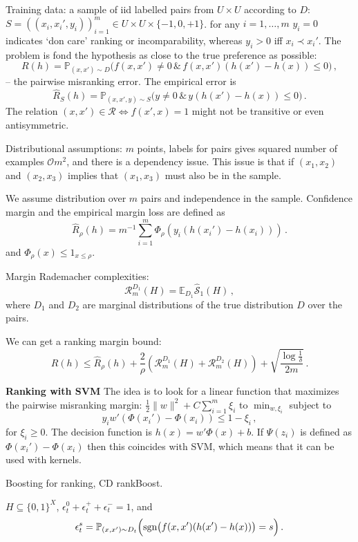 \documentclass[a4paper]{article}
\newcommand{\ex}{\mathbb{E}}
\newcommand{\pr}{\mathbb{P}}
\begin{document}
Training data: a sample of iid labelled pairs from $U\times U$ according to $D$:
$S = ((x_i, x_i', y_i))_{i=1}^m\in U\times U\times \{-1, 0, +1\}$. for any $i=1,\ldots, m$
$y_i = 0$ indicates `don care' ranking or incomparability, whereas $y_i>0$ iff
$x_i \prec x_i'$. The problem is fond the hypothesis as close to the true preference
as possible:
\[ R(h) = \pr_{(x,x')\sim D} \bigl( f(x,x') \neq 0\,\&\,f(x,x')(h(x')-h(x)) \leq 0 \bigr)
    \,,\]
-- the pairwise misranking error. The empirical error is
\[ \hat{R}_S(h) = \pr_{(x,x',y)\sim S} \bigl( y \neq 0\,\&\,y (h(x')-h(x)) \leq 0 \bigr)
    \,.\]
The relation $(x,x')\in \mathcal{R} \Leftrightarrow f(x',x) = 1$ might not be transitive
or even antisymmetric.

Distributional assumptions: $m$ points, labels for pairs gives squared number of
examples $\mathcal{O}m^2$, and there is a dependency issue. This issue is that if
$(x_1,x_2)$ and $(x_2,x_3)$ implies that $(x_1,x_3)$ must also be in the sample.

We assume distribution over $m$ pairs and independence in the sample. Confidence
margin and the empirical margin loss are defined as
\[ \hat{R}_\rho(h) = m^{-1} \sum_{i=1}^m \Phi_\rho(y_i (h(x_i') - h(x_i))) \,. \]
and $\Phi_\rho(x) \leq 1_{x\leq \rho}$.

Margin Rademacher complexities: 
\[\mathcal{R}_m^{D_1}(H) = \ex_{D_1} \hat{\mathcal{S}}_1(H) \,, \]
where $D_1$ and $D_2$ are marginal distributions of the true distribution $D$ over
the pairs.

We can get a ranking margin bound:
\[ R(h) \leq \hat{R}_\rho(h)
    + \frac{2}{\rho}(\mathcal{R}_m^{D_1}(H)+\mathcal{R}_m^{D_2}(H))
    + \sqrt{\frac{\log\frac{1}{\delta}}{2m}}
    \,. \]

\textbf{Ranking with SVM} The idea is to look for a linear function that maximizes
the pairwise misranking margin: $\frac{1}{2}\|w\|^2 + C \sum_{i=1}^m \xi_i$ to
$\min_{w, \xi_i}$ subject to
\[ y_i w'( \Phi(x_i') - \Phi(x_i)) \leq 1 - \xi_i \,,\]
for $\xi_i\geq 0$. The decision function is $h(x) = w'\Phi(x) + b$. If $\Psi(z_i)$
is defined as $\Phi(x_i')-\Phi(x_i)$ then this coincides with SVM, which means that
it can be used with kernels.

Boosting for ranking, CD rankBoost.

$H\subseteq \{0,1\}^X$, $\epsilon^0_t+\epsilon^+_t+\epsilon^-_t=1$, and
\[ \epsilon^s_t
    = \pr_{(x,x')\sim D_t} \Bigl(\text{sgn}\bigl( f(x,x')(h(x')-h(x)) \bigr) = s \Bigr)
    \,.\]
\end{document}
